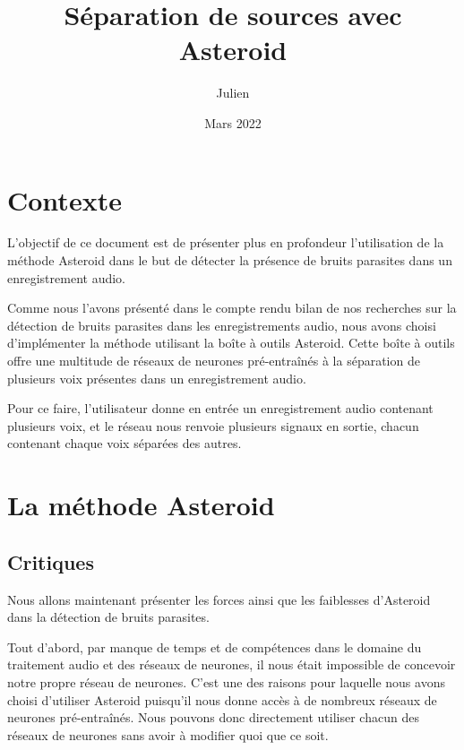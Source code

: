 \documentclass{article}
\title{Séparation de sources avec Asteroid}
\author{Julien \bsc{Alonzo}}
\date{Mars 2022}
\begin{document}
\maketitle
\tableofcontents

\begin{license}
\end{license}

\newpage

\section{Contexte}

L'objectif de ce document est de présenter plus en profondeur l'utilisation de la méthode Asteroid dans le but de détecter la présence de bruits parasites dans un enregistrement audio.

Comme nous l'avons présenté dans le compte rendu bilan de nos recherches sur la détection de bruits parasites dans les enregistrements audio, nous avons choisi d'implémenter la méthode utilisant la boîte à outils Asteroid. Cette boîte à outils offre une multitude de réseaux de neurones pré-entraînés à la séparation de plusieurs voix présentes dans un enregistrement audio.

Pour ce faire, l'utilisateur donne en entrée un enregistrement audio contenant plusieurs voix, et le réseau nous renvoie plusieurs signaux en sortie, chacun contenant chaque voix séparées des autres.

\section{La méthode Asteroid}

\subsection{Critiques}
Nous allons maintenant présenter les forces ainsi que les faiblesses d'Asteroid dans la détection de bruits parasites.

Tout d'abord, par manque de temps et de compétences dans le domaine du traitement audio et des réseaux de neurones, il nous était impossible de concevoir notre propre réseau de neurones. C'est une des raisons pour laquelle nous avons choisi d'utiliser Asteroid puisqu'il nous donne accès à de nombreux réseaux de neurones pré-entraînés. Nous pouvons donc directement utiliser chacun des réseaux de neurones sans avoir à modifier quoi que ce soit. 
\end{document}
